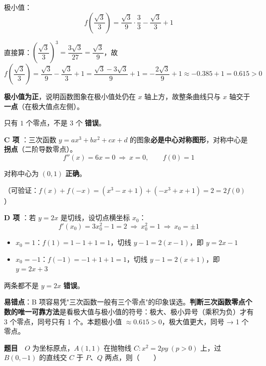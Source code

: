 极小值：
\[f\left(\frac{\sqrt3}3\right)=\frac{\sqrt3}{9}\cdot\frac{3}{3}-\frac{\sqrt3}3+1\]

直接算：$\left(\dfrac{\sqrt3}3\right)^{3}=\dfrac{3\sqrt3}{27}=\dfrac{\sqrt3}9$，故
\[f\left(\frac{\sqrt3}3\right)=\frac{\sqrt3}9-\frac{\sqrt3}3+1=\frac{\sqrt3-3\sqrt3}9+1=-\frac{2\sqrt3}9+1\approx-0.385+1=0.615>0\]

\textbf{极小值为正}，说明函数图象在极小值处仍在 $x$ 轴上方，故整条曲线只与 $x$ 轴交于\textbf{一点}（在极大值点左侧）。

只有 $1$ 个零点，不是 $3$ 个  \textbf{错误}。

\par\medskip

\textbf{C 项 }：三次函数 $y=ax^3+bx^2+cx+d$ 的图象\textbf{必是中心对称图形}，对称中心是\textbf{拐点}（二阶导数零点）。
\[f''(x)=6x=0\ \Longrightarrow\ x=0,\qquad f(0)=1\]

对称中心为 $(0,1)$  \textbf{正确}。

（可验证：$f(x)+f(-x)=\left(x^3-x+1\right)+\left(-x^3+x+1\right)=2=2f(0)$ ）

\par\medskip

\textbf{D 项 }：若 $y=2x$ 是切线，设切点横坐标 $x_0$：
\[f'\left(x_0\right)=3x_0^{2}-1=2\ \Longrightarrow\ x_0^{2}=1\ \Longrightarrow\ x_0=\pm1\]

\begin{itemize}
\item $x_0=1$：$f(1)=1-1+1=1$，切线 $y-1=2(x-1)$，即 $y=2x-1$
\item $x_0=-1$：$f(-1)=-1+1+1=1$，切线 $y-1=2(x+1)$，即 $y=2x+3$
\end{itemize}

两条都不是 $y=2x$  \textbf{错误}。


\begin{gktip}
\textbf{易错点}：B 项容易凭"三次函数一般有三个零点"的印象误选。\textbf{判断三次函数零点个数的唯一可靠方法}是看极大值与极小值的符号：极大、极小异号（乘积为负）才有 3 个零点，同号只有 1 个。本题极小值 $\approx0.615>0$，极大值更大，同号 → 1 个零点。
\end{gktip}

\par\medskip


\textbf{题目}　$O$ 为坐标原点，$A(1,1)$ 在抛物线 $C:x^{2}=2py\ (p>0)$ 上，过 $B(0,-1)$ 的直线交 $C$ 于 $P$、$Q$ 两点，则（　　）

